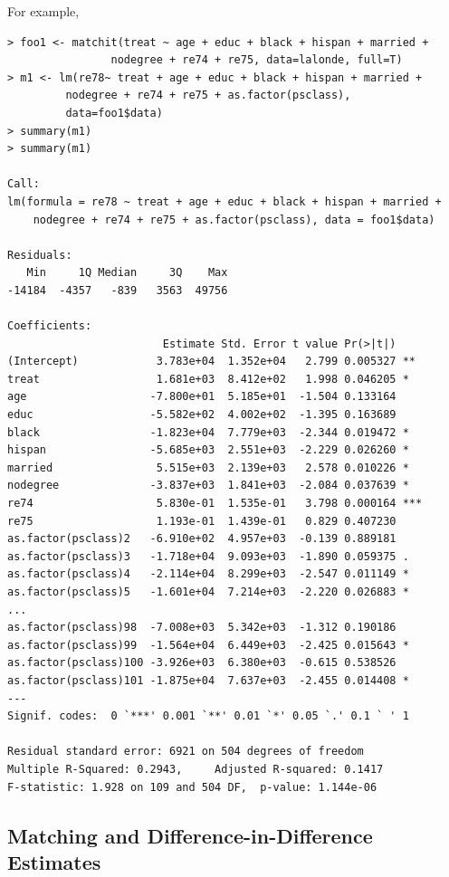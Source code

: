 \documentclass[oneside,letterpaper,titlepage]{article}
\begin{document}
For example, 

\begin{verbatim}
> foo1 <- matchit(treat ~ age + educ + black + hispan + married +
                nodegree + re74 + re75, data=lalonde, full=T)
> m1 <- lm(re78~ treat + age + educ + black + hispan + married +
         nodegree + re74 + re75 + as.factor(psclass),
         data=foo1$data)
> summary(m1)
> summary(m1)

Call:
lm(formula = re78 ~ treat + age + educ + black + hispan + married + 
    nodegree + re74 + re75 + as.factor(psclass), data = foo1$data)

Residuals:
   Min     1Q Median     3Q    Max 
-14184  -4357   -839   3563  49756 

Coefficients:
                        Estimate Std. Error t value Pr(>|t|)    
(Intercept)            3.783e+04  1.352e+04   2.799 0.005327 ** 
treat                  1.681e+03  8.412e+02   1.998 0.046205 *  
age                   -7.800e+01  5.185e+01  -1.504 0.133164    
educ                  -5.582e+02  4.002e+02  -1.395 0.163689    
black                 -1.823e+04  7.779e+03  -2.344 0.019472 *  
hispan                -5.685e+03  2.551e+03  -2.229 0.026260 *  
married                5.515e+03  2.139e+03   2.578 0.010226 *  
nodegree              -3.837e+03  1.841e+03  -2.084 0.037639 *  
re74                   5.830e-01  1.535e-01   3.798 0.000164 ***
re75                   1.193e-01  1.439e-01   0.829 0.407230    
as.factor(psclass)2   -6.910e+02  4.957e+03  -0.139 0.889181    
as.factor(psclass)3   -1.718e+04  9.093e+03  -1.890 0.059375 .  
as.factor(psclass)4   -2.114e+04  8.299e+03  -2.547 0.011149 *  
as.factor(psclass)5   -1.601e+04  7.214e+03  -2.220 0.026883 *  
...
as.factor(psclass)98  -7.008e+03  5.342e+03  -1.312 0.190186    
as.factor(psclass)99  -1.564e+04  6.449e+03  -2.425 0.015643 *  
as.factor(psclass)100 -3.926e+03  6.380e+03  -0.615 0.538526    
as.factor(psclass)101 -1.875e+04  7.637e+03  -2.455 0.014408 *  
---
Signif. codes:  0 `***' 0.001 `**' 0.01 `*' 0.05 `.' 0.1 ` ' 1 

Residual standard error: 6921 on 504 degrees of freedom
Multiple R-Squared: 0.2943,     Adjusted R-squared: 0.1417 
F-statistic: 1.928 on 109 and 504 DF,  p-value: 1.144e-06 
\end{verbatim} 

\subsection{Matching and Difference-in-Difference Estimates}
\end{document}
